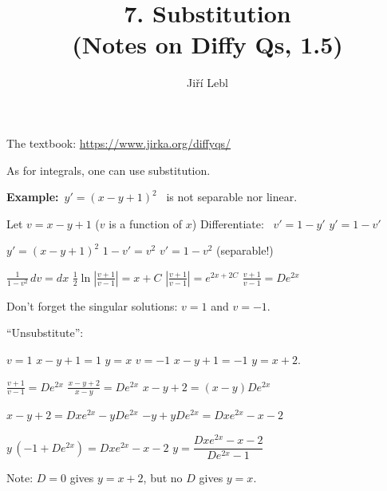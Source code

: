 \documentclass[10pt,aspectratio=169]{beamer}
\author{Ji\v{r}\'i Lebl}
\institute[OSU]{%
Oklahoma State University%
}
\title{7. Substitution\\(Notes on Diffy Qs, 1.5)}
\date{}
\begin{document}
\begin{frame}
\titlepage


\begin{center}
The textbook: \url{https://www.jirka.org/diffyqs/}
\end{center}
\end{frame}

\begin{frame}
As for integrals, one can use substitution.

\medskip
\pause

\textbf{Example:}~$y' = {(x-y+1)}^2$~ is not separable nor linear.

\medskip
\pause

Let $v = x-y+1$
\pause
\quad
($v$ is a function of $x$)
\qquad
\pause
Differentiate: ~$v' = 1 - y'$
\pause
\wthus
$y' = 1-v'$

\medskip
\pause

$y' = {(x-y+1)}^2$
\wthus
$1-v' = v^2$
\pause
\wthus
$v' = 1-v^2$
\quad
\pause
(separable!)

\medskip
\pause

$\displaystyle
\frac{1}{1-v^2} \,dv = dx$
\pause
\wthus
$\displaystyle
\frac{1}{2} \ln \left\lvert  \frac{v+1}{v-1} \right\rvert = x + C$
\pause
\wthus
$\displaystyle
\left\lvert \frac{v+1}{v-1} \right\rvert = e^{2x + 2C}$
\pause
\wthus
$\displaystyle
\frac{v+1}{v-1} = D e^{2x}$

\medskip
\pause

Don't forget the singular solutions: $v=1$ and $v=-1$.

\medskip
\pause

``Unsubstitute'':

\medskip
\pause

$v=1$
\pause
\wthus
$x-y+1=1$
\pause
\wthus $y=x$
\pause
\hfill
$v=-1$
\pause
\wthus
$x-y+1=-1$
\pause
\wthus
$y=x+2$.

\medskip
\pause

$\displaystyle
\frac{v+1}{v-1} = D e^{2x}$
\pause
\wthus
$\displaystyle
\frac{x-y+2}{x-y} = D e^{2x}$
\pause
\wthus
$x-y+2 = (x-y)D e^{2x}$

\medskip

\pause
\wthus
$x-y+2 = Dx e^{2x}-yD e^{2x}$
\pause
\wthus
$-y + yD e^{2x} = Dx e^{2x} - x - 2$

\medskip

\pause
\wthus
$y\,(-1+ D e^{2x}) = Dx e^{2x} - x - 2$
\pause
\wthus
$y  = \dfrac{Dx e^{2x} - x - 2}{D e^{2x}-1}$

\medskip
\pause

Note: $D=0$ gives $y=x+2$, but no $D$ gives $y=x$.

\end{frame}
\end{document}
